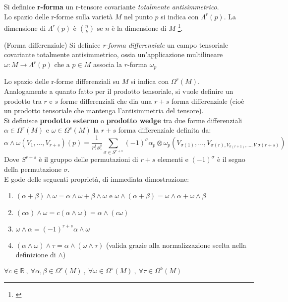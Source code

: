Si definice \textbf{r-forma} un r-tensore covariante \emph{totalmente antisimmetrico}.\\

Lo spazio delle r-forme sulla varietà $M$ nel punto $p$ si indica con $\Lambda^r(p)$.
La dimensione di $\Lambda^r(p)$ è ${n}\choose{k}$ se $n$ è la dimensione di $M$
\footnote{ \cite{} }.\\
\begin{definition}{(Forma differenziale)}
   Si definice \emph{r-forma differenziale} un campo tensoriale covariante
  totalmente antisimmetrico, ossia un'applicazione multilineare
  $\omega : M \to \Lambda^r(p)$ che a $p \in M$ associa la $r$-forma $\omega_p$
\end{definition}
Lo spazio delle r-forme differenziali su $M$ si indica con $\Omega^r(M)$.\\

Analogamente a quanto fatto per il prodotto tensoriale, si vuole definire un prodotto
tra $r$ e $s$ forme differenziali che dia una $r+s$ forma differenziale (cioè un
prodotto tensoriale che mantenga l'antisimmetria del tensore).\\

Si definisce \textbf{prodotto esterno} o \textbf{prodotto wedge} tra due forme
differenziali $\alpha \in \Omega^r(M)$ e $\omega \in \Omega^s(M)$ la $r+s$ forma
differenziale definita da:
$$ \alpha \wedge \omega (V_1,\dots,V_{r+s})(p) =
   \frac{1}{r!s!}\sum_{\sigma \in S^{r+s} } (-1)^\sigma
   \alpha_p\otimes\omega_p (V_{\sigma(1)}, \dots , V_{\sigma(r),
      V_{\sigma(r+1)}, \dots , V_,\sigma(r+s)})$$
Dove $S^{r+s}$ è il gruppo delle permutazioni di $r+s$ elementi e $(-1)^\sigma$
è il segno della permutazione $\sigma$.\\
E gode delle seguenti proprietà, di immediata dimostrazione:
\begin{enumerate}
    \item $(\alpha + \beta) \wedge \omega = \alpha\wedge\omega + \beta\wedge\omega$ e
          $\omega \wedge(\alpha + \beta)  = \omega\wedge\alpha + \omega\wedge\beta$
    \item $(c\alpha)\wedge\omega = c(\alpha\wedge\omega) = \alpha\wedge(c\omega)$
    \item $\omega\wedge\alpha = (-1)^{r+s} \alpha\wedge\omega$
    \item $(\alpha\wedge\omega)\wedge\tau = \alpha\wedge(\omega\wedge\tau)$
       (valida grazie alla normalizzazione scelta nella definizione di $\wedge$)
\end{enumerate}
$\forall c\in \mathbb{R} \: , \: \forall \alpha,\beta \in \Omega^r(M) \: , \:
   \forall \omega \in \Omega^s(M) \: , \: \forall \tau \in \Omega^k(M)$
\\

